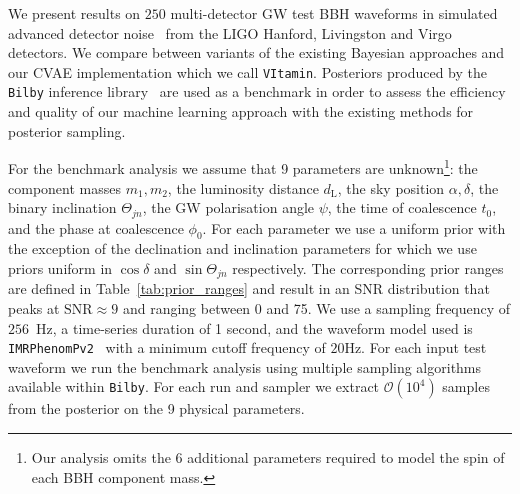 \documentclass[%
showpacs,
nofootinbib,
 amsmath,amssymb,
 aps,
 twocolumn,
 prl,
 reprint,
floatfix,
]{revtex4-1}
\begin{document}
%
%

%
%
%
%
We present results on $250$ multi-detector \ac{GW} test \ac{BBH}
waveforms in simulated advanced detector noise~\cite{aligo_noisecurves}
from the LIGO Hanford, Livingston and Virgo detectors. We compare between
variants of the existing Bayesian approaches and our \ac{CVAE} implementation
which we call \texttt{VItamin}. Posteriors produced by the \texttt{Bilby}
inference library~\cite{1811.02042} are used as a benchmark in order to assess
the efficiency and quality of our machine learning approach with the existing
methods for posterior sampling.

%
%
For the benchmark analysis we assume that 9 parameters are
unknown\footnote{Our analysis omits the 6 additional parameters required to
model the spin of each \ac{BBH} component mass.}: the component masses
$m_1,m_2$, the luminosity distance $d_{\text{L}}$, the sky position
$\alpha,\delta$, the binary inclination $\Theta_{jn}$, the \ac{GW} polarisation
angle ${\psi}$, the time of coalescence $t_{0}$, and the phase at coalescence
$\phi_0$. For each parameter we use a uniform prior with the exception of
the declination and inclination parameters for which we use priors uniform in
$\cos\delta$ and $\sin\Theta_{jn}$ respectively. The corresponding prior ranges
are defined in Table~\ref{tab:prior_ranges} and result in an \ac{SNR}
distribution that peaks at $\text{SNR}\approx 9$ and ranging between 0 and 75.
We use a sampling frequency of $256$~Hz, a time-series duration of 1 second, and
the waveform model used is \texttt{IMRPhenomPv2}~\cite{1809.10113} with a
minimum cutoff frequency of $20$Hz. For each input test waveform we run the
benchmark analysis using multiple sampling algorithms available within
\texttt{Bilby}. For each run and sampler we extract $\mathcal{O}(10^4)$
samples from the posterior on the 9 physical parameters.  
\end{document}
